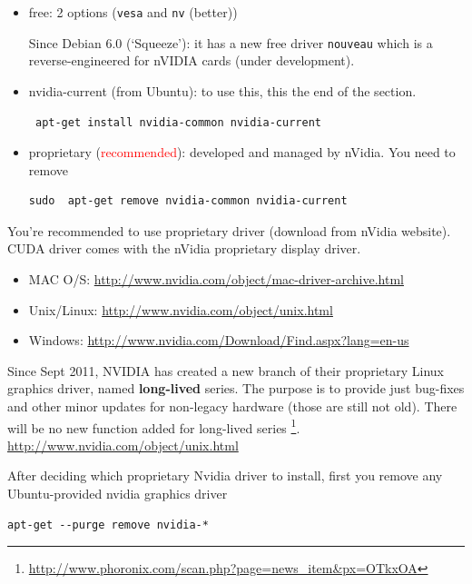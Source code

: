 \begin{itemize}
\item free: 2 options (\verb!vesa! and \verb!nv! (better))

  Since Debian 6.0 (`Squeeze'): it has a new free driver
  \verb!nouveau! which is a reverse-engineered for nVIDIA cards (under
  development).
  
\item nvidia-current (from Ubuntu): to use this, this the end of the section.
\begin{verbatim}
 apt-get install nvidia-common nvidia-current
\end{verbatim}

\item proprietary (\textcolor{red}{recommended}): developed and managed by
nVidia. You need to remove
\begin{verbatim}
sudo  apt-get remove nvidia-common nvidia-current
\end{verbatim}
\end{itemize}

You're recommended to use proprietary driver (download from nVidia website).
CUDA driver comes with the nVidia proprietary display driver.
\begin{itemize}
  \item MAC O/S: \url{http://www.nvidia.com/object/mac-driver-archive.html}
  \item Unix/Linux: \url{http://www.nvidia.com/object/unix.html}
  \item Windows: \url{http://www.nvidia.com/Download/Find.aspx?lang=en-us}
\end{itemize}


\begin{mdframed}
Since Sept 2011, NVIDIA has created a new branch of their proprietary Linux
graphics driver, named {\bf long-lived} series. The purpose is to provide just
bug-fixes and other minor updates for non-legacy hardware (those are still
not old). There will be no new function added for long-lived series
\footnote{\url{http://www.phoronix.com/scan.php?page=news_item&px=OTkxOA}}. 
\url{http://www.nvidia.com/object/unix.html}

\end{mdframed}

After deciding which proprietary Nvidia driver to install, first you remove any
Ubuntu-provided nvidia graphics driver
\begin{verbatim}
apt-get --purge remove nvidia-*
\end{verbatim}

